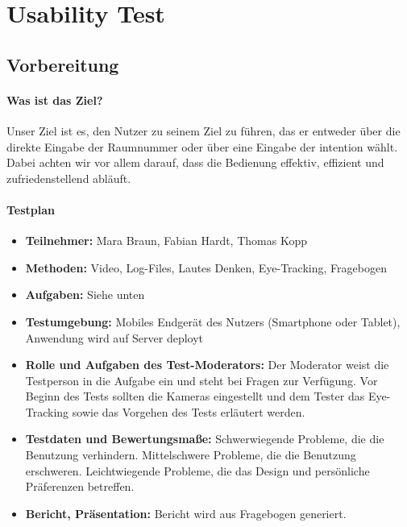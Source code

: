 \chapter{Usability Test}

\section{Vorbereitung}

\subsubsection*{Was ist das Ziel?}
Unser Ziel ist es, den Nutzer zu seinem Ziel zu führen, das er entweder über die direkte Eingabe der Raumnummer oder über eine Eingabe der \gls{intention} wählt.
Dabei achten wir vor allem darauf, dass die Bedienung effektiv, effizient und zufriedenstellend abläuft.
\subsubsection*{Testplan}
\begin{itemize}
\item \textbf{Teilnehmer:} Mara Braun, Fabian Hardt, Thomas Kopp
\item \textbf{Methoden:} Video, Log-Files, Lautes Denken, Eye-Tracking, Fragebogen
\item \textbf{Aufgaben:} Siehe unten
\item \textbf{Testumgebung:} Mobiles Endgerät des Nutzers (Smartphone oder Tablet), Anwendung wird auf Server deployt
\item \textbf{Rolle und Aufgaben des Test-Moderators:} Der Moderator weist die Testperson in die Aufgabe ein und steht bei Fragen zur Verfügung. Vor Beginn des Tests sollten die Kameras eingestellt und dem Tester das Eye-Tracking sowie das Vorgehen des Tests erläutert werden.
\item \textbf{Testdaten und Bewertungsmaße:} Schwerwiegende Probleme, die die Benutzung verhindern. Mittelschwere Probleme, die die Benutzung erschweren. Leichtwiegende Probleme, die das Design und persönliche Präferenzen betreffen.
\item \textbf{Bericht, Präsentation:} Bericht wird aus Fragebogen generiert.

\end{itemize}
